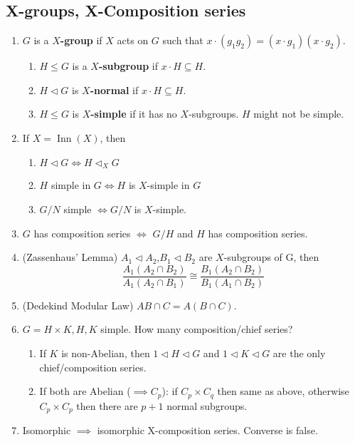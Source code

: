 \documentclass[10pt]{article}
\newcommand{\ltri}{\triangleleft}
\DeclareMathOperator{\inn}{Inn}
\begin{document}
\begin{multicols*}{3}
  \section{X-groups, X-Composition series}
  \begin{enumerate}
    \item $G$ is a \textbf{$X$-group} if $X$ acts on $G$ such that
    $x\cdot(g_{1}g_{2})=(x\cdot g_{1})(x\cdot g_{2})$. \begin{enumerate}
      \item $H\leq G$ is a \textbf{$X$-subgroup} if $x\cdot H\subseteq H$.
      \item $H\ltri G$ is \textbf{$X$-normal} if $x\cdot H\subseteq H$.
      \item $H\leq G$ is \textbf{$X$-simple} if it has no $X$-subgroups. $H$ might
      not be simple.
    \end{enumerate}
    \item If $X=\inn(X)$, then \begin{enumerate}
      \item $H\ltri G \iff H\ltri_{X}G$
      \item $H$ simple in $G\iff H$ is $X$-simple in $G$
      \item $G/N$ simple $\iff G/N$ is $X$-simple.
    \end{enumerate}
    \item $G$ has composition series $\iff$ $G/H$ and $H$ has composition series.
    \item (Zassenhaus' Lemma) $A_{1}\ltri A_{2}$,$B_{1}\ltri B_{2}$ are
    $X$-subgroups of G, then \[\frac{A_{1}(A_{2}\cap B_{2})}{A_{1}(A_{2}\cap B_{1})}\cong\frac{B_{1}(A_{2}\cap B_{2})}{B_{1}(A_{1}\cap B_{2})} \]
    \item (Dedekind Modular Law) $AB\cap C=A(B\cap C)$.
    \item $G=H\times K, H, K$ simple. How many composition/chief series?
    \begin{enumerate}
      \item If $K$ is non-Abelian, then ${1}\ltri H\ltri G$ and
      ${1}\ltri K\ltri G$ are the only chief/composition series.
      \item If both are Abelian ($\implies C_{p}$): if $C_{p}\times C_{q}$ then same
      as above, otherwise $C_{p}\times C_{p}$ then  there are $p+1$ normal subgroups.
    \end{enumerate}
    \item Isomorphic $\implies$ isomorphic X-composition series. Converse is false.
  \end{enumerate}


\end{multicols*}
\end{document}
